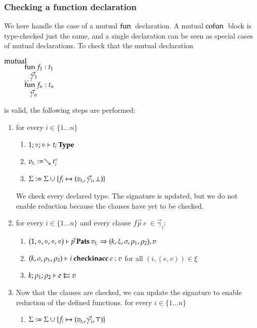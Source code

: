 \subsubsection{Checking a function declaration}
We here handle the case of a mutual $\fun$ declaration.
A mutual $\cofun$ block is type-checked just the same,
and a single declaration can be seen as special cases of mutual declarations.
To check that the mutual declaration
\begin{bsp}
$\mutual$\\
$\spcx \fun f_1 : t_1 $\\
$\spcx \spc \vec{\gamma}_1$\\
$\spcx \ldots$\\
$\spcx \fun f_n : t_n $\\
$\spcx \spc \vec{\gamma}_n$\\
\end{bsp}
is valid, the following steps are performed:
\begin{enumerate}
\item
for every $i \in \{1 \ldots n \} $
\begin{enumerate}
\item
$\IsType{1}{\diamond}{\diamond}{t_i}$
\item
$v_{t_i} := \wh \cl{t_i}{\diamond}$
\item
$\Sig := \Sig \cup \{f_i \mapsto (v_{t_i},\vec{\gamma}_i,\bot)\}$
\end{enumerate}
We check every declared type. The signature is updated, 
but we do not enable reduction because the clauses have yet to be checked. 
\item
for every $i \in \{ 1 \ldots n \} $ and every clause  $ f \vec{p} \: e \: \in \vec{\gamma}_i$:
\begin{enumerate}
\item
$\checkps{1,\diamond,\diamond,\diamond,\diamond}{\vec{p}}{v_{t_i}}{k,\xi,\sigma,\rho_1,\rho_2}{v}$
\item
$\checkinacc{k,\sigma,\rho_1,\rho_2}{i}{e}{v}$ for all $(i,(e,v)) \in \xi$ 
\item 
$\Check{k}{\rho_1}{\rho_2}{e}{v}$
\end{enumerate}
\item
Now that the clauses are checked, we can update the signature to enable reduction of the defined functions.
for every $i \in \{ 1 \ldots n \} $
\begin{enumerate}
\item
$\Sig := \Sig \cup \{f_i \mapsto (v_{t_i},\vec{\gamma_i},\top)\}$
\end{enumerate}
\end{enumerate}

